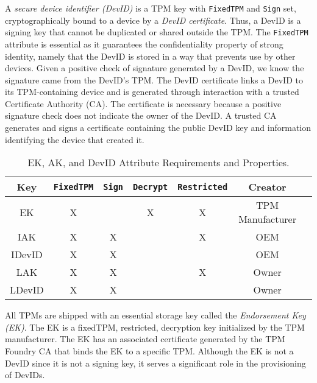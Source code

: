 \documentclass[runningheads]{llncs}
\begin{document}
A \emph{secure device identifier (DevID)} is a TPM key with
\verb|FixedTPM| and \verb|Sign| set, cryptographically bound to a
device by a \emph{DevID certificate}.  Thus, a DevID is a signing key
that cannot be duplicated or shared outside the TPM.  The
\verb|FixedTPM| attribute is essential as it guarantees the
confidentiality property of strong identity, namely that the DevID is
stored in a way that prevents use by other devices. Given a positive
check of signature generated by a DevID, we know the signature came
from the DevID's TPM.  The DevID certificate links a DevID to its
TPM-containing device and is generated through interaction with a
trusted Certificate Authority (CA).  The certificate is necessary
because a positive signature check does not indicate the owner of the
DevID.  A trusted CA generates and signs a certificate containing the
public DevID key and information identifying the device that created
it.

\begin{table}[hbtp]
  \begin{center}
    \footnotesize
    \begin{tabular}{ |c|c|c|c|c|c|c| }
      \hline
Key & \verb|FixedTPM| & \verb|Sign| & \verb|Decrypt| & \verb|Restricted| &
Creator \\
      \hline
      \hline
      EK & X &   & X & X & TPM Manufacturer \\
      \hline
      IAK & X & X &   & X & OEM   \\
      \hline
      IDevID & X & X &   &   & OEM   \\
      \hline
      LAK & X & X &   & X & Owner  \\
      \hline
      LDevID & X & X &   &   & Owner  \\
      \hline
    \end{tabular}
    \caption{EK, AK, and DevID Attribute Requirements and Properties.}
    \label{fig:req_and_recs}
  \end{center}
\end{table}

All TPMs are shipped with an essential storage key called the \emph{Endorsement
Key (EK)}.  The EK is a fixedTPM, restricted, decryption key initialized
by the TPM manufacturer.  The EK has an associated certificate generated 
by the TPM Foundry CA that binds the EK to a specific TPM. Although 
the EK is not a DevID since it is not a signing key,
it serves a significant role in the provisioning of DevIDs.
\end{document}

